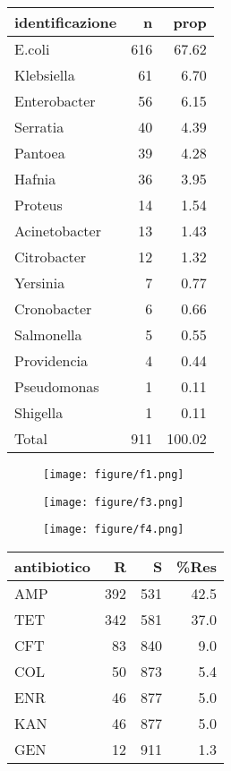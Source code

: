 \documentclass{article}
\begin{document}
\begin{table}[h]
\centering
\begin{tabular}{l|r|r}
\hline
identificazione & n & prop\\
\hline
E.coli & 616 & 67.62\\
\hline
Klebsiella & 61 & 6.70\\
\hline
Enterobacter & 56 & 6.15\\
\hline
Serratia & 40 & 4.39\\
\hline
Pantoea & 39 & 4.28\\
\hline
Hafnia & 36 & 3.95\\
\hline
Proteus & 14 & 1.54\\
\hline
Acinetobacter & 13 & 1.43\\
\hline
Citrobacter & 12 & 1.32\\
\hline
Yersinia & 7 & 0.77\\
\hline
Cronobacter & 6 & 0.66\\
\hline
Salmonella & 5 & 0.55\\
\hline
Providencia & 4 & 0.44\\
\hline
Pseudomonas & 1 & 0.11\\
\hline
Shigella & 1 & 0.11\\
\hline
Total & 911 & 100.02\\
\hline
\end{tabular}
\end{table}

\begin{figure}[]
\texttt{[image: figure/f1.png]} \caption{}\label{fig:unnamed-chunk-1}
\end{figure}

\begin{figure}[]
\texttt{[image: figure/f3.png]} \caption{}\label{fig:unnamed-chunk-1}
\end{figure}

\begin{figure}[]
\texttt{[image: figure/f4.png]} \caption{}\label{fig:unnamed-chunk-1}
\end{figure}



\begin{table}[h]
\centering
\begin{tabular}{l|r|r|r}
\hline
antibiotico & R & S & \%Res\\
\hline
AMP & 392 & 531 & 42.5\\
\hline
TET & 342 & 581 & 37.0\\
\hline
CFT & 83 & 840 & 9.0\\
\hline
COL & 50 & 873 & 5.4\\
\hline
ENR & 46 & 877 & 5.0\\
\hline
KAN & 46 & 877 & 5.0\\
\hline
GEN & 12 & 911 & 1.3\\
\hline
\end{tabular}
\end{table}
\end{document}

